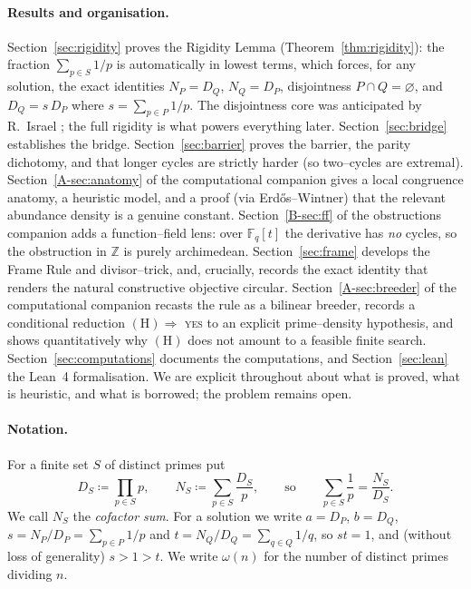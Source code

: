 \documentclass[11pt]{article}
\theoremstyle{definition}
\begin{document}
\paragraph{Results and organisation.}
Section~\ref{sec:rigidity} proves the Rigidity Lemma (Theorem~\ref{thm:rigidity}): the fraction
$\sum_{p\in S}1/p$ is automatically in lowest terms, which forces, for any solution, the exact
identities $N_P=D_Q$, $N_Q=D_P$, disjointness $P\cap Q=\varnothing$, and $D_Q=s\,D_P$ where
$s=\sum_{p\in P}1/p$. The disjointness core was anticipated by R.~Israel \cite{MO320838}; the full
rigidity is what powers everything later. Section~\ref{sec:bridge} establishes the bridge.
Section~\ref{sec:barrier} proves the barrier, the parity dichotomy, and that longer cycles are
strictly harder (so two--cycles are extremal). Section~\ref{A-sec:anatomy} of the computational companion gives a local congruence
anatomy, a heuristic model, and a proof (via Erd\H{o}s--Wintner) that the relevant abundance density
is a genuine constant. Section~\ref{B-sec:ff} of the obstructions companion adds a function--field lens: over $\mathbb{F}_q[t]$ the
derivative has \emph{no} cycles, so the obstruction in $\mathbb{Z}$ is purely archimedean.
Section~\ref{sec:frame} develops the Frame Rule and divisor--trick,
and, crucially, records the exact identity that renders the natural constructive objective
circular. Section~\ref{A-sec:breeder} of the computational companion recasts the rule as a bilinear breeder, records a conditional
reduction $(\mathrm{H})\Rightarrow$ \textsc{yes} to an explicit prime--density hypothesis, and shows
quantitatively why $(\mathrm{H})$ does not amount to a feasible finite search.
Section~\ref{sec:computations} documents the computations, and Section~\ref{sec:lean} the
Lean~4 formalisation. We are explicit throughout about what is proved, what is heuristic, and what
is borrowed; the problem remains open.

\paragraph{Notation.}
For a finite set $S$ of distinct primes put
\[
D_S \coloneqq \prod_{p\in S} p, \qquad N_S \coloneqq \sum_{p\in S} \frac{D_S}{p},
\qquad\text{so}\qquad \sum_{p\in S}\frac1p = \frac{N_S}{D_S}.
\]
We call $N_S$ the \emph{cofactor sum}. For a solution we write $a=D_P$, $b=D_Q$,
$s=N_P/D_P=\sum_{p\in P}1/p$ and $t=N_Q/D_Q=\sum_{q\in Q}1/q$, so $st=1$, and (without loss of
generality) $s>1>t$. We write $\omega(n)$ for the number of distinct primes dividing $n$.
\end{document}
